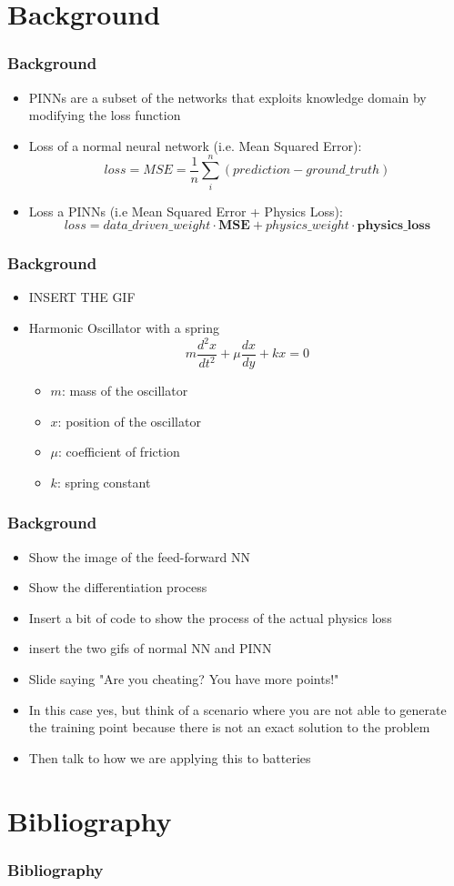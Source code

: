 \documentclass{beamer}
\begin{document}
\section{Background}

\begin{frame}
  \frametitle{Background}
  \begin{itemize}
    \item PINNs are a subset of the networks that exploits knowledge domain by modifying the loss function
    \item Loss of a normal neural network (i.e. Mean Squared Error):
          $$
            loss = MSE = \frac{1}{n} \sum_{i}^{n}(prediction - ground\_truth)
          $$
    \item Loss a PINNs (i.e Mean Squared Error + Physics Loss):
          $$
            loss = data\_driven\_weight \cdot \textbf{MSE} + physics\_weight \cdot \textbf{physics\_loss}
          $$
  \end{itemize}
\end{frame}
\begin{frame}
  \frametitle{Background}
  \begin{itemize}
    \item INSERT THE GIF
    \item Harmonic Oscillator with a spring
          $$
            m \frac{d^2x}{dt^2} + \mu\frac{dx}{dy} + kx = 0
          $$
          \begin{itemize}
            \item $m$: mass of the oscillator
            \item $x$: position of the oscillator
            \item $\mu$: coefficient of friction
            \item $k$: spring constant
          \end{itemize}
  \end{itemize}
\end{frame}


\begin{frame}
  \frametitle{Background}
  \begin{itemize}
    \item Show the image of the feed-forward NN
    \item Show the differentiation process
    \item Insert a bit of code to show the process of the actual physics loss
    \item insert the two gifs of normal NN and PINN
    \item Slide saying "Are you cheating? You have more points!"
    \item In this case yes, but think of a scenario where you are not able to generate the training point because there is not an exact solution to the problem
    \item Then talk to how we are applying this to batteries
  \end{itemize}
\end{frame}

\section{Bibliography}
\begin{frame}
  \frametitle{Bibliography}
  \printbibliography
\end{frame}
\end{document}
